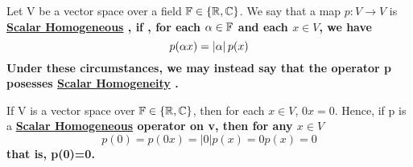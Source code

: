\label{def:scalarhomogeneous}
\newcommand{\ScalarHomogeneous}[0]{
    \bf \hyperref[def:scalarhomogeneous]{Scalar Homogeneous} \rm
}

\newcommand{\ScalarHomogeneity}[0]{
    \bf \hyperref[def:scalarhomogeneous]{Scalar Homogeneity} \rm
}
\begin{df}
    Let V be a vector space over a field $\mathbb{F} \in \{\mathbb{R}, \mathbb{C}\}$. 
    We say that a map $p:V \to V$ is \ScalarHomogeneous, if
    , for each $\alpha \in \mathbb{F}$ and each $x \in V$, we have 
    \begin{equation}
        p(\alpha x) = \left| \alpha \right| p(x)
    \end{equation}
    Under these circumstances, we may instead say that the operator p posesses \ScalarHomogeneity.
    
\end{df}


\label{rmk:seminorm}
\begin{rmk}

If V is a vector space over $\mathbb{F} \in \{\mathbb{R}, \mathbb{C}\}$, then for each $x \in V$, $0x=0$.
Hence, if p is a \ScalarHomogeneous operator on v, then for any $x \in V$
\begin{equation}
p(0)=p(0x)=|0|p(x)=0p(x)=0
\end{equation}
that is, p(0)=0. 
\end{rmk}




